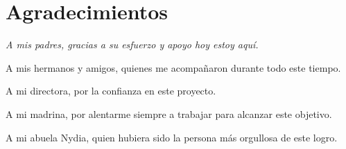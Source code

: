 %
\chapter*{Agradecimientos}
%
{\itshape
A mis padres, gracias a su esfuerzo y apoyo hoy estoy aquí.

A mis hermanos y amigos, quienes me acompañaron durante todo este
tiempo.

A mi directora, por la confianza en este proyecto.

A mi madrina, por alentarme siempre a trabajar para alcanzar este
objetivo.

A mi abuela Nydia, quien hubiera sido la persona más orgullosa de este
logro.
}

